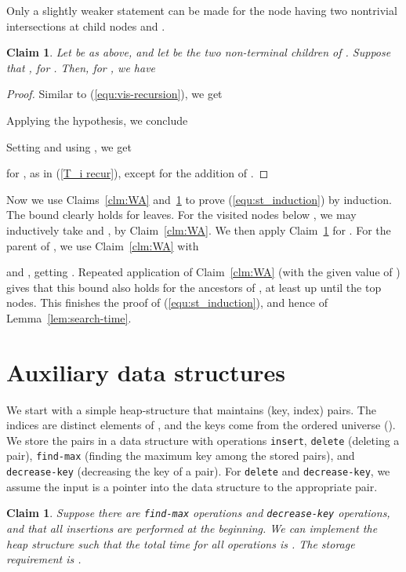 \documentclass[letterpaper,11pt]{article}
\newtheorem{claim}[theorem]{Claim}
\newcommand{\findmax}{\texttt{find-max}}
\newcommand{\deckey}{\texttt{decrease-key}}
\begin{document}
Only a slightly weaker statement 
can be made for the node  having two
nontrivial intersections at child 
nodes  and .

\begin{claim}\label{clm:WR}
  Let  be as above, and 
  let  be the 
  two non-terminal children of
  . Suppose that 
  , 
  for . Then, 
  for , 
  we have
  
\end{claim}

\begin{proof}
Similar to (\ref{equ:vis-recursion}), 
we get

Applying the hypothesis, 
we conclude

Setting  
and using , we get 

for , 
as in (\ref{T_i recur}), except 
for the addition of .
\end{proof}

Now we use Claims~\ref{clm:WA} 
and~\ref{clm:WR} to prove 
(\ref{equ:st_induction}) by induction. 
The bound clearly holds for leaves.
For the visited nodes
below , we may inductively 
take  and , by 
Claim~\ref{clm:WA}.
We then apply Claim~\ref{clm:WR} for .
For the parent  of , we 
use Claim~\ref{clm:WA} with
 
and , getting
. 
Repeated application of Claim~\ref{clm:WA}  
(with the given value of ) gives 
that this bound also holds for the
ancestors of , at least up until 
the  top nodes. 
This finishes the proof of 
(\ref{equ:st_induction}), and 
hence of Lemma~\ref{lem:search-time}.




\section{Auxiliary data structures} \label{sec:data-str}

We start with a simple heap-structure 
that maintains (key, index) pairs.
The indices are distinct elements of 
, and the keys come
from the ordered universe  (). 
We store the pairs in a data structure
with operations \texttt{insert}, 
\texttt{delete} (deleting a pair),
\texttt{find-max} (finding the maximum 
key among the stored pairs), and 
\texttt{decrease-key}
(decreasing the key of a pair). 
For \texttt{delete} and
\texttt{decrease-key}, we assume the input 
is a pointer into the
data structure to the appropriate pair.

\begin{claim}\label{clm:ds} 
  Suppose there are  \textup{\findmax{}} 
  operations and  \textup{\deckey{}} operations,
  and that all insertions are performed at the beginning.
  We can implement the heap structure such that the total time 
  for all operations is . The storage requirement is
  .
\end{claim}
\end{document}

